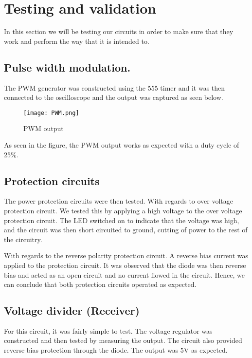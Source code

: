 \documentclass[class=report,11pt,crop=false]{standalone}
\begin{document}
\section{Testing and validation}

In this section we will be testing our circuits in order to make sure that they work and perform the way that it is intended to.

\subsection{Pulse width modulation.}

The PWM generator was constructed using the 555 timer and it was then connected to the oscilloscope and the output was captured as seen below.
\begin{figure}
    \centering
    \texttt{[image: PWM.png]}
    \caption{PWM output}
    \label{fig:enter-label}
\end{figure}

As seen in the figure, the PWM output works as expected with a duty cycle of 25\%.

\subsection{Protection circuits}

The power protection circuits were then tested. With regards to over voltage protection circuit. We tested this by applying a high voltage to the over voltage protection circuit. The LED switched on to indicate that the voltage was high, and the circuit was then short circuited to ground, cutting of power to the rest of the circuitry.

With regards to the reverse polarity protection circuit. A reverse bias current was applied to the protection circuit. It was observed that the diode was then reverse bias and acted as an open circuit and no current flowed in the circuit. Hence, we can conclude that both protection circuits operated as expected.

\subsection{Voltage divider (Receiver)}

For this circuit, it was fairly simple to test. The voltage regulator was constructed and then tested by measuring the output. The circuit also provided reverse bias protection through the diode. The output was 5V as expected.
\end{document}
